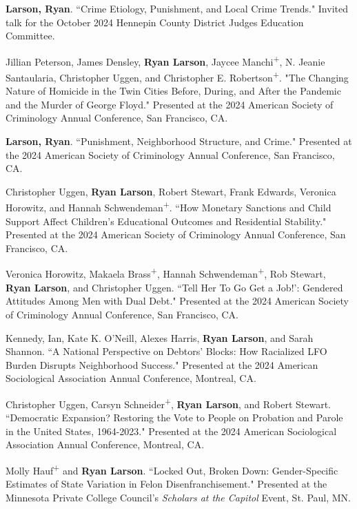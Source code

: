 \documentclass[letterpaper]{article}
\newenvironment{publist}{%
  \begin{list}{}{%
    \setlength{\leftmargin}{0cm}   %
    \setlength{\labelwidth}{2cm}     %
    \setlength{\labelsep}{0.5cm}     %
  }%
}{%
  \end{list}%
}
\begin{document}
\begin{publist}
\item \textbf{Larson, Ryan}. ``Crime Etiology, Punishment, and Local Crime Trends." Invited talk for the October 2024 Hennepin County District Judges Education Committee.  

\item Jillian Peterson, James Densley, \textbf{Ryan Larson}, Jaycee Manchi\textsuperscript{+}, N. Jeanie Santaularia, Christopher Uggen, and Christopher E. Robertson\textsuperscript{+}. "The Changing Nature of Homicide in the Twin Cities Before, During, and After the Pandemic and the Murder of George Floyd." Presented at the 2024 American Society of Criminology Annual Conference, San Francisco, CA. 

\item \textbf{Larson, Ryan}. ``Punishment, Neighborhood Structure, and Crime." Presented at the 2024 American Society of Criminology Annual Conference, San Francisco, CA. 

\item Christopher Uggen, \textbf{Ryan Larson}, Robert Stewart, Frank Edwards, Veronica Horowitz, and Hannah Schwendeman\textsuperscript{+}. ``How Monetary Sanctions and Child Support Affect Children's Educational Outcomes and Residential Stability." Presented at the 2024 American Society of Criminology Annual Conference, San Francisco, CA. 

\item Veronica Horowitz, Makaela Brass\textsuperscript{+}, Hannah Schwendeman\textsuperscript{+}, Rob Stewart, \textbf{Ryan Larson}, and Christopher Uggen. ``Tell Her To Go Get a Job!': Gendered Attitudes Among Men with Dual Debt." Presented at the 2024 American Society of Criminology Annual Conference, San Francisco, CA. 

\item Kennedy, Ian, Kate K. O’Neill, Alexes Harris, \textbf{Ryan Larson}, and Sarah Shannon. ``A National Perspective on Debtors’ Blocks: How Racialized LFO Burden Disrupts Neighborhood Success." Presented at the 2024 American Sociological Association Annual Conference, Montreal, CA. 

\item Christopher Uggen, Carsyn Schneider\textsuperscript{+}, \textbf{Ryan Larson}, and Robert Stewart. ``Democratic Expansion? Restoring the Vote to People on Probation and Parole in the United States, 1964-2023." Presented at the 2024 American Sociological Association Annual Conference, Montreal, CA. 

\item Molly Hauf\textsuperscript{+} and \textbf{Ryan Larson}. ``Locked Out, Broken Down: Gender-Specific Estimates of State Variation in Felon Disenfranchisement." Presented at the Minnesota Private College Council's \textit{Scholars at the Capitol} Event, St. Paul, MN. 


\end{publist}
\end{document}
